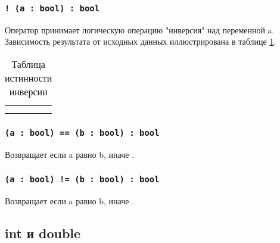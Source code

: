 \subsubsection{\lstinline`! (a : bool) : bool`}

Оператор принимает логическую операцию "инверсия" над переменной a. Зависимость результата от исходных данных иллюстрирована в таблице \ref{invtable}.

\begin{table}[htb]
	\caption{Таблица истинности инверсии}
	\label{invtable}
	\begin{tabular}{|c|c|}
		\hline
		\code{a} & \code{!a} \\ \hline
		\false{} & \true{} 	 \\ \hline
		\true{}  & \false{}  \\ \hline
	\end{tabular}
	\vspace{-2em}
\end{table}

\subsubsection{\lstinline`(a : bool) == (b : bool) : bool`}

Возвращает \true{} если a равно b, иначе \false{}.

\subsubsection{\lstinline`(a : bool) != (b : bool) : bool`}

Возвращает \true{} если a равно b, иначе \false{}.

\subsection{{\color{lightblue}int} и {\color{lightblue}double}}

